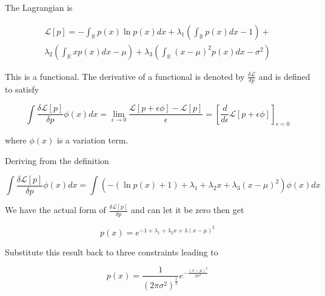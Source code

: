 \documentclass{article}
\begin{document}
            The Lagrangian is

            \begin{multline*}
                 \mathcal{L}[p] = -\int_{\mathbb{R}} p(x) \ln p(x) dx +
                 \lambda_1 \left( \int_{\mathbb{R}} p(x) dx - 1 \right) + \\
                 \lambda_2 \left( \int_{\mathbb{R}} x p(x) dx - \mu \right) +
                 \lambda_3 \left( \int_{\mathbb{R}} (x - \mu)^2 p(x) dx - \sigma^2 \right)
            \end{multline*}

            This is a functional. The derivative of a functional is
            denoted by $ \frac{\delta \mathcal{L}}{\delta p} $ and is defined to satisfy

            \begin{equation*}
                 \int \frac{\delta \mathcal{L}[p]}{\delta p} \phi(x) dx =
                 \lim_{\epsilon \rightarrow 0}\frac{\mathcal{L}[p + \epsilon
                 \phi] - \mathcal{L}[p]}{\epsilon} = 
                 \left[
                     \frac{d}{d \epsilon} \mathcal{L}[p + \epsilon \phi]
                 \right]_{\epsilon = 0}
            \end{equation*}

            where $ \phi(x) $ is a variation term.

            Deriving from the definition

            \begin{equation*}
                 \int \frac{\delta \mathcal{L}[p]}{\delta p} \phi(x) dx = \int 
                 \left( - ( \ln p(x) + 1 ) + \lambda_1 + \lambda_2 x +
                 \lambda_3 (x - \mu)^2 \right) \phi(x) dx
            \end{equation*}

            We have the actual form of $ \frac{\delta \mathcal{L}[p]}{\delta p} $ and can let it be zero then get

            \begin{equation*}
                 p(x) = e^{ -1 + \lambda_1 + \lambda_2 x + \lambda(x - \mu)^2 }
            \end{equation*}

            Substitute this result back to three constraints leading to

            \begin{equation*}
                 p(x) = \frac{1}{ (2 \pi \sigma^2)^{\frac{1}{2}} } e^{ -\frac{(x - \mu)^2}{2 \sigma^2} }
            \end{equation*}
\end{document}
